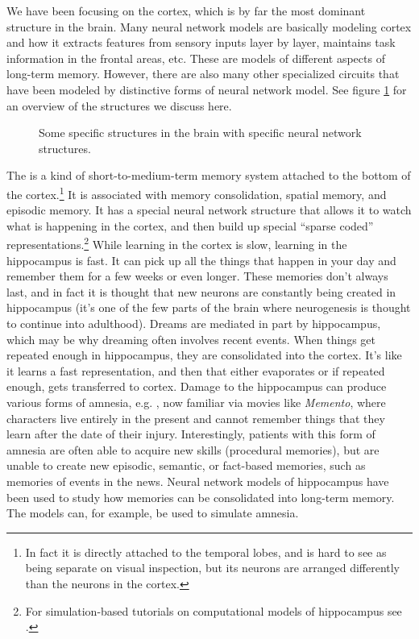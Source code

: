 We have been focusing on the cortex, which is by far the most dominant structure in the brain. Many neural network models are basically modeling cortex and how it extracts features from sensory inputs layer by layer, maintains task information in the frontal areas, etc. These are models of different aspects of long-term memory. However, there are also many other specialized circuits that have been modeled by distinctive forms of neural network model. See figure \ref{brain_internal} for an overview of the structures we discuss here.

\begin{figure}[h]
\centering
{}
\caption[Pamela Payne.]{Some specific structures in the brain with specific neural network structures.}
\label{brain_internal}
\end{figure}

The  is a kind of short-to-medium-term memory system attached to the bottom of the cortex.\footnote{In fact it is directly attached to the temporal lobes, and is hard to see as being separate on visual inspection, but its neurons are arranged differently than the neurons in the cortex.} It is associated with memory consolidation, spatial memory, and episodic memory. It has a special neural network structure that allows it to watch what is happening in the cortex, and then build up special ``sparse coded'' representations.\footnote{For simulation-based tutorials on computational models of hippocampus see .}  While learning in the cortex is slow, learning in the hippocampus is fast. It can pick up all the things that happen in your day and remember them for a few weeks or even longer. These memories don't always last, and in fact it is thought that new neurons are constantly being created in hippocampus (it's one of the few parts of the brain where neurogenesis is thought to continue into adulthood). Dreams are mediated in part by hippocampus, which may be why dreaming often involves recent events. When things get repeated enough in hippocampus, they are consolidated into the cortex. It's like it learns a fast representation, and then that either evaporates or if repeated enough, gets transferred to cortex. Damage to the hippocampus can produce various forms of amnesia, e.g. , now familiar via movies like \emph{Memento}, where characters live entirely in the present and cannot remember things that they learn after the date of their injury. Interestingly, patients with this form of amnesia are often able to acquire new skills (procedural memories), but are unable to create new episodic, semantic, or fact-based memories, such as memories of events in the news. Neural network models of hippocampus have been used to study how memories can be consolidated into long-term memory. The models can, for example, be used to simulate amnesia.

